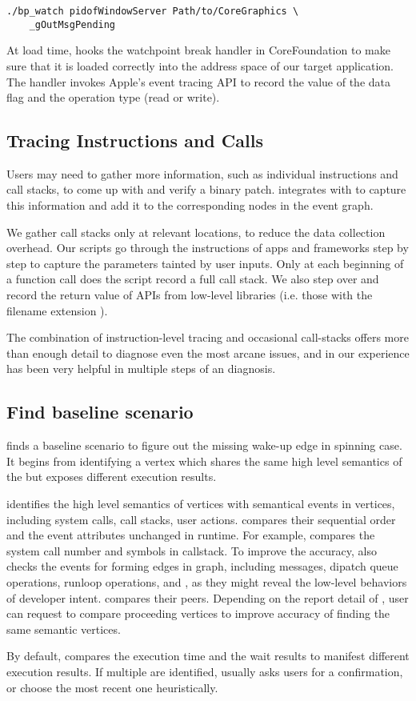 \begin{lstlisting}
./bp_watch pidofWindowServer Path/to/CoreGraphics \
	_gOutMsgPending
\end{lstlisting}

At load time, \xxx hooks the watchpoint break handler in CoreFoundation to
make sure that it is loaded correctly into the address space of our target
application. The handler invokes Apple's event tracing API to record the value
of the data flag and the operation type (read or write).

\subsection{Tracing Instructions and Calls}

Users may need to gather more information, such as individual instructions and call stacks, to
come up with and verify a binary patch. \xxx integrates with \vv{lldb} to capture this information
and add it to the corresponding nodes in the event graph.

We gather call stacks only at relevant locations, to reduce the data collection overhead.
Our \vv{lldb} scripts go through the instructions of apps and frameworks step by
step to capture the parameters tainted by user inputs. Only at each beginning of
a function call does the script record a full call stack. We also step over and
record the return value of APIs from low-level libraries (i.e. those with the
filename extension \vv{.dylib}).

The combination of instruction-level tracing and occasional call-stacks offers
more than enough detail to diagnose even the most arcane issues, and in our
experience has been very helpful in multiple steps of an \xxx diagnosis.

\subsection{Find baseline scenario}

\xxx finds a baseline scenario to figure out the missing wake-up edge in
spinning case. It begins from identifying a vertex which shares
the same high level semantics of the \spinningnode but exposes
different execution results. 

\xxx identifies the high level semantics of vertices with semantical events
in vertices, including system calls, call stacks, user actions. \xxx compares
their sequential order and the event attributes unchanged in runtime. For
example, \xxx compares the system call number and symbols in callstack.
To improve the accuracy, \xxx also checks the events for forming edges in
graph, including messages, dipatch queue operations, runloop operations,
\dataflagread and \dataflagwrite, as they might reveal the low-level behaviors
of developer intent. \xxx compares their peers. Depending on the report detail
of \spinningnode, user can request \xxx to compare proceeding vertices to
improve accuracy of finding the same semantic vertices.

By default, \xxx compares the execution time and the wait results to manifest
different execution results. If multiple \similarnode are identified,
\xxx usually asks users for a confirmation, or choose the most recent one
heuristically.
